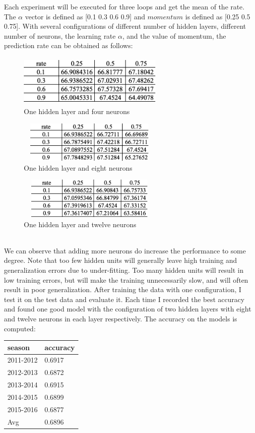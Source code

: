 \documentclass{article}
\begin{document}
Each experiment will be executed for three loops and get the mean of the rate. The $\alpha$ vector is defined as [0.1 0.3 0.6 0.9] and $momentum$ is defined as [0.25 0.5 0.75]. With several configurations of different number of hidden layers, different number of neurons, the learning rate $\alpha$, and the value of momentum, the prediction rate can be obtained as follows:
\begin{figure}[htbp]
 \centering
 \includegraphics[width=7cm, height=2.5cm]{rate1}
  \caption{One hidden layer and four neurons}
\end{figure}
\begin{figure}[htbp]
 \centering
 \includegraphics[width=7cm, height=2cm]{rate2}
  \caption{One hidden layer and eight neurons}
\end{figure}
\begin{figure}[htbp]
 \centering
 \includegraphics[width=7cm, height=2cm]{rate3}
  \caption{One hidden layer and twelve neurons}
\end{figure}
\\
We can observe that adding more neurons do increase the performance to some degree. Note that too few hidden units will generally leave high training and generalization errors due to under-fitting. Too many hidden units will result in low training errors, but will make the training unnecessarily slow, and will often result in poor generalization.
After training the data with one configuration, I test it on the test data and evaluate it. Each time I recorded the best accuracy and found one good model with the configuration of two hidden layers with eight and twelve neurons in each layer respectively. The accuracy on the models is computed:
\begin{center}
\begin{tabular}{|l|l|}
\hline
season    & accuracy           \\ \hline
2011-2012 & 0.6917 \\ \hline
2012-2013 & 0.6872 \\ \hline
2013-2014 & 0.6915 \\ \hline
2014-2015 & 0.6899  \\ \hline
2015-2016 & 0.6877 \\ \hline
Avg & 0.6896 \\ \hline
\end{tabular}
\end{center}
\end{document}

